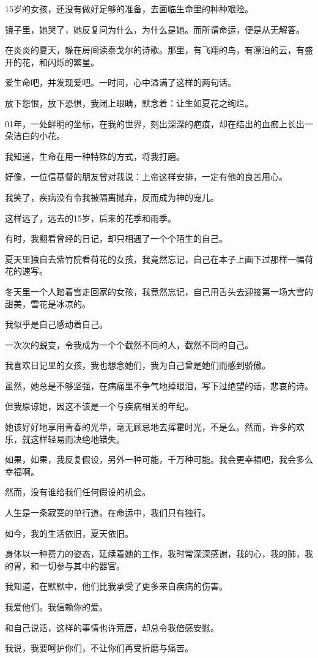 		15岁的女孩，还没有做好足够的准备，去面临生命里的种种艰险。\par
		镜子里，她哭了，她反复问为什么，为什么是她。而所谓命运，便是从无解答。\par
		在炎炎的夏天，躲在房间读泰戈尔的诗歌。那里，有飞翔的鸟，有漂泊的云，有盛开的花，和闪烁的繁星。\par
		爱生命吧，并发现爱吧。一时间，心中溢满了这样的两句话。\par
		放下怨恨，放下恐惧，我闭上眼睛，默念着：让生如夏花之绚烂。

		01年，一处鲜明的坐标，在我的世界，刻出深深的疤痕，却在结出的血痂上长出一朵洁白的小花。\par
		我知道，生命在用一种特殊的方式，将我打磨。\par
		好像，一位信基督的朋友曾对我说：上帝这样安排，一定有他的良苦用心。\par
		我笑了，疾病没有令我被隔离抛弃，反而成为神的宠儿。

		这样远了，远去的15岁，后来的花季和雨季。

		有时，我翻看曾经的日记，却只相遇了一个个陌生的自己。\par
		夏天里独自去紫竹院看荷花的女孩，我竟然忘记，自己在本子上画下过那样一幅荷花的速写。\par
		冬天里一个人踏着雪走回家的女孩，我竟然忘记，自己用舌头去迎接第一场大雪的甜美，雪花是冰凉的。

		我似乎是自己感动着自己。

		一次次的蜕变，令我成为一个个截然不同的人，截然不同的自己。\par
		我喜欢日记里的女孩，我也想念她们，我为自己曾是她们而感到骄傲。\par
		虽然，她总是不够坚强，在病痛里不争气地掉眼泪，写下过绝望的话，悲哀的诗。\par
		但我原谅她，因这不该是一个与疾病相关的年纪。\par
		她该好好地享用青春的光华，毫无顾忌地去挥霍时光，不是么。然而，许多的欢乐，就这样轻易而决绝地错失。

		如果，如果，我反复假设，另外一种可能，千万种可能。我会更幸福吧，我会多么幸福啊。\par
		然而，没有谁给我们任何假设的机会。

		人生是一条寂寞的单行道。在命运中，我们只有独行。

		如今，我的生活依旧，夏天依旧。

		身体以一种费力的姿态，延续着她的工作，我时常深深感谢，我的心，我的肺，我的胃，和一切参与其中的器官。\par
		我知道，在默默中，他们比我承受了更多来自疾病的伤害。\par
		我爱他们。我信赖你的爱。\par
		和自己说话，这样的事情也许荒唐，却总令我倍感安慰。\par
		我说，我要呵护你们，不让你们再受折磨与痛苦。

